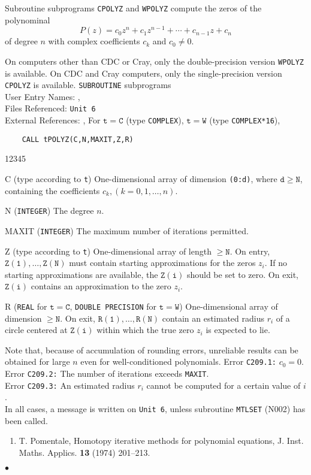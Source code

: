                  
             
        
Subroutine subprograms {\tt CPOLYZ} and {\tt WPOLYZ}
compute the zeros of the polynominal
$$ P(z)=c_0z^n+c_1z^{n-1}+\cdots+c_{n-1}z+c_n$$
of degree $n$ with complex coefficients $c_k$ and $c_0 \ne 0$.
\par
On computers other than CDC or Cray, only
the double-precision version {\tt WPOLYZ} is available.
On CDC and  Cray computers, only the single-precision version
{\tt CPOLYZ} is available.
\Structure
{\tt SUBROUTINE} subprograms \\
User  Entry  Names: ,  \\
Files  Referenced:  {\tt Unit 6} \\
External References: , 
\Usage
For $\mathtt{t=C}$ (type {\tt COMPLEX}), $\mathtt{t=W}$ (type
{\tt COMPLEX*16}),
\begin{verbatim}
    CALL tPOLYZ(C,N,MAXIT,Z,R)
\end{verbatim}
\begin{DLtt}{12345}
\item[C] (type according to {\tt t}) One-dimensional array of
dimension {\tt (0:d)}, where $\mathtt{d \ge N}$, containing the
coefficients $c_k, (k = 0,1,\ldots,n)$.
\item[N] ({\tt INTEGER}) The degree $n$.
\item[MAXIT] ({\tt INTEGER}) The maximum number of iterations permitted.
\item[Z] (type according to {\tt t}) One-dimensional array of length
$\mathtt{\ge N}$. On entry, $\mathtt{Z(1),\ldots,Z(N)}$ must contain
starting approximations for the zeros $z_i$. If no starting
approximations are available, the $\mathtt{Z(i)}$ should be set
to zero. On exit, $\mathtt{Z(i)}$ contains an approximation to the zero
$z_i$.
\item[R] ({\tt REAL} for $\mathtt{t=C}$, {\tt DOUBLE PRECISION} for
$\mathtt{t=W}$) One-dimensional array of dimension $\ge \mathtt{N}$.
On exit, $\mathtt{R(1),\ldots,R(N)}$ contain an estimated radius $r_i$
of a circle centered at $\mathtt{Z(i)}$ within which the true zero
$z_i$ is expected to lie.
\end{DLtt}
\Notes
Note that, because of accumulation of rounding errors, unreliable
results can be obtained for large $n$ even for well-conditioned
polynomials.
\Errorh
Error {\tt C209.1:} $c_0=0$. \\
Error {\tt C209.2:} The number of iterations exceeds {\tt MAXIT}. \\
Error {\tt C209.3:} An estimated radius $r_i$ cannot be computed for a
certain value of $i$. \\
In all cases, a message is written on {\tt Unit 6},
unless subroutine {\tt MTLSET} (N002) has been called.
\Refer
\begin{enumerate}
\item T. Pomentale, Homotopy iterative methods for
polynomial equations, J. Inst. Maths. Applics. {\bf 13} (1974) 201--213.
\end{enumerate}
$\bullet$

